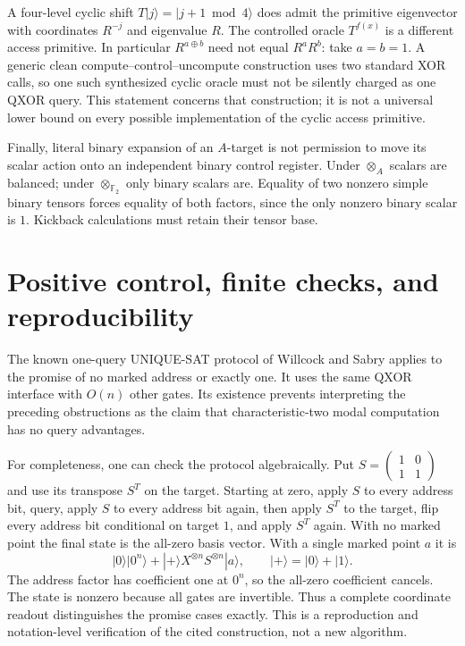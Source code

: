 \documentclass[11pt]{article}
\newcommand{\F}{\mathbb F}
\begin{document}
A four-level cyclic shift $T\lvert j\rangle=\lvert j+1\bmod4\rangle$ does admit the primitive eigenvector with coordinates $R^{-j}$ and eigenvalue $R$. The controlled oracle $T^{f(x)}$ is a different access primitive. In particular $R^{a\mathbin\oplus b}$ need not equal $R^aR^b$: take $a=b=1$. A generic clean compute--control--uncompute construction uses two standard XOR calls, so one such synthesized cyclic oracle must not be silently charged as one QXOR query. This statement concerns that construction; it is not a universal lower bound on every possible implementation of the cyclic access primitive.

Finally, literal binary expansion of an $A$-target is not permission to move its scalar action onto an independent binary control register. Under $\otimes_A$ scalars are balanced; under $\otimes_{\F_2}$ only binary scalars are. Equality of two nonzero simple binary tensors forces equality of both factors, since the only nonzero binary scalar is $1$. Kickback calculations must retain their tensor base.

\section{Positive control, finite checks, and reproducibility}\label{sec:checks}
The known one-query UNIQUE-SAT protocol of Willcock and Sabry \cite{WillcockSabry2011} applies to the promise of no marked address or exactly one. It uses the same QXOR interface with $O(n)$ other gates. Its existence prevents interpreting the preceding obstructions as the claim that characteristic-two modal computation has no query advantages.

For completeness, one can check the protocol algebraically. Put $S=\left(\begin{smallmatrix}1&0\\1&1\end{smallmatrix}\right)$ and use its transpose $S^T$ on the target. Starting at zero, apply $S$ to every address bit, query, apply $S$ to every address bit again, then apply $S^T$ to the target, flip every address bit conditional on target $1$, and apply $S^T$ again. With no marked point the final state is the all-zero basis vector. With a single marked point $a$ it is
\[
 |0\rangle|0^n\rangle+|+\rangle X^{\otimes n}S^{\otimes n}|a\rangle,
 \qquad |+\rangle=|0\rangle+|1\rangle.
\]
The address factor has coefficient one at $0^n$, so the all-zero coefficient cancels. The state is nonzero because all gates are invertible. Thus a complete coordinate readout distinguishes the promise cases exactly. This is a reproduction and notation-level verification of the cited construction, not a new algorithm.
\end{document}
